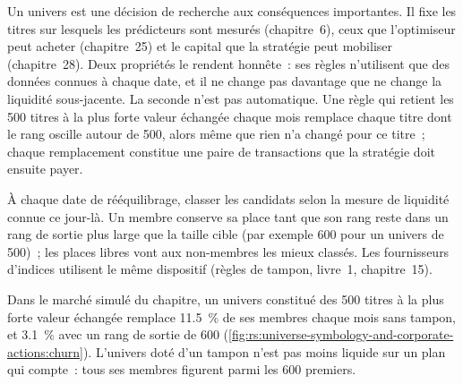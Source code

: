 Un univers est une décision de recherche aux conséquences importantes. Il fixe les titres sur lesquels les prédicteurs sont mesurés (chapitre~6), ceux
que l'optimiseur peut acheter (chapitre~25) et le capital que la stratégie peut mobiliser (chapitre~28). Deux propriétés le rendent honnête~:
ses règles n'utilisent que des données connues à chaque date, et il ne change pas davantage que ne change la liquidité sous-jacente. La seconde
n'est pas automatique. Une règle qui retient les 500 titres à la plus forte valeur échangée chaque mois remplace chaque titre dont le rang
oscille autour de 500, alors même que rien n'a changé pour ce titre~; chaque remplacement constitue une paire de transactions que la stratégie
doit ensuite payer.

\begin{method}\label{met:rs:universe-symbology-and-corporate-actions:buffer}
À chaque date de rééquilibrage, classer les candidats selon la mesure de liquidité connue ce jour-là. Un membre conserve sa place tant que son rang
reste dans un rang de sortie plus large que la taille cible (par exemple 600 pour un univers de 500)~; les places libres vont aux non-membres les mieux
classés. Les fournisseurs d'indices utilisent le même dispositif (règles de tampon, livre~1, chapitre~15).
\end{method}

Dans le marché simulé du chapitre, un univers constitué des 500 titres à la plus forte valeur échangée remplace 11.5~\% de ses membres chaque mois
sans tampon, et 3.1~\% avec un rang de sortie de 600 (\cref{fig:rs:universe-symbology-and-corporate-actions:churn}). L'univers doté
d'un tampon n'est pas moins liquide sur un plan qui compte~: tous ses membres figurent parmi les 600 premiers.

\begin{omfigure}

\label{fig:rs:universe-symbology-and-corporate-actions:churn}
\end{omfigure}

